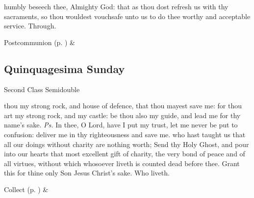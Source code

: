 
\postcommunion
{} humbly beseech thee, Almighty God: that as thou dost refresh us with thy sacraments, so thou wouldest vouchsafe unto us to do thee worthy and acceptable service. Through.
\begin{rubric}
     Postcommunion  (p. \pageref{SPSaints}) \&  
\end{rubric}


\subsection{Quinquagesima Sunday}
\begin{inhead}
{Second Class Semidouble}
\end{inhead}


\introit
{} thou my strong rock, and house of defence, that thou mayest save me: for thou art my strong rock, and my castle: be thou also my guide, and lead me for thy name's sake. \textit{Ps.} In thee, O Lord, have I put my trust, let me never be put to confusion: deliver me in thy righteousness and save me.
\collect
{} who hast taught us that all our doings without charity are nothing worth; Send thy Holy Ghost, and pour into our hearts that most excellent gift of charity, the very bond of peace and of all virtues, without which whosoever liveth is counted dead before thee. Grant this for thine only Son Jesus Christ's sake. Who liveth.
\begin{rubric}
     Collect  (p. \pageref{SPSaints}) \&  
\end{rubric}

